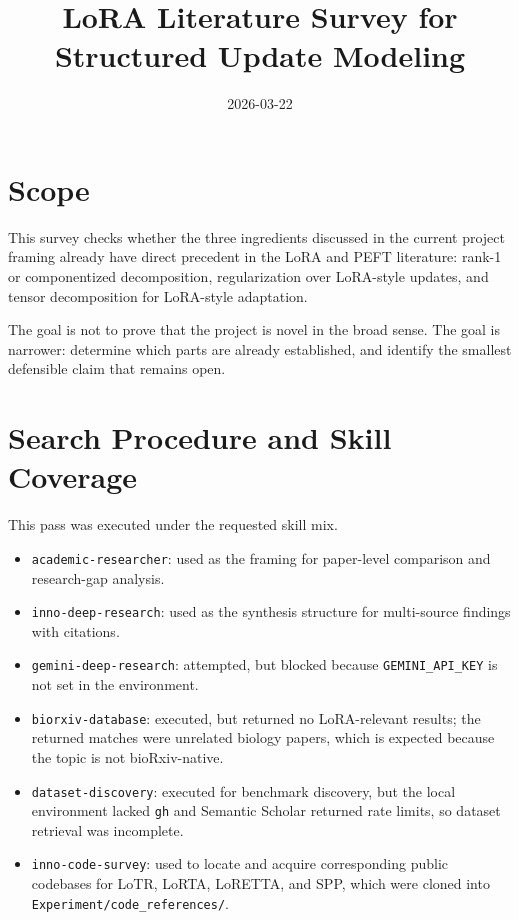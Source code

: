 \documentclass[11pt]{article}
\title{LoRA Literature Survey for Structured Update Modeling}
\date{2026-03-22}
\begin{document}
\maketitle

\section{Scope}

This survey checks whether the three ingredients discussed in the current project framing already have direct precedent in the LoRA and PEFT literature: rank-1 or componentized decomposition, regularization over LoRA-style updates, and tensor decomposition for LoRA-style adaptation.

The goal is not to prove that the project is novel in the broad sense. The goal is narrower: determine which parts are already established, and identify the smallest defensible claim that remains open.

\section{Search Procedure and Skill Coverage}

This pass was executed under the requested skill mix.

\begin{itemize}
\item \texttt{academic-researcher}: used as the framing for paper-level comparison and research-gap analysis.
\item \texttt{inno-deep-research}: used as the synthesis structure for multi-source findings with citations.
\item \texttt{gemini-deep-research}: attempted, but blocked because \texttt{GEMINI\_API\_KEY} is not set in the environment.
\item \texttt{biorxiv-database}: executed, but returned no LoRA-relevant results; the returned matches were unrelated biology papers, which is expected because the topic is not bioRxiv-native.
\item \texttt{dataset-discovery}: executed for benchmark discovery, but the local environment lacked \texttt{gh} and Semantic Scholar returned rate limits, so dataset retrieval was incomplete.
\item \texttt{inno-code-survey}: used to locate and acquire corresponding public codebases for LoTR, LoRTA, LoRETTA, and SPP, which were cloned into \texttt{Experiment/code\_references/}.
\end{itemize}
\end{document}
